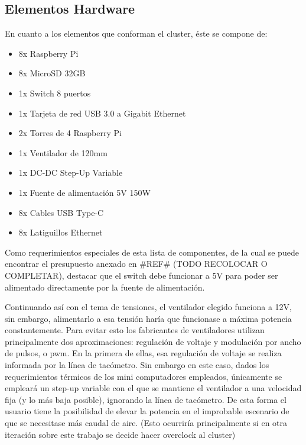 \subsection{Elementos Hardware}
En cuanto a los elementos que conforman el cluster, éste se compone de:
\begin{itemize}
    \item 8x Raspberry Pi
    \item 8x MicroSD 32GB
    \item 1x Switch 8 puertos
    \item 1x Tarjeta de red USB 3.0 a Gigabit Ethernet 
    \item 2x Torres de 4 Raspberry Pi
    \item 1x Ventilador de 120mm
    \item 1x DC-DC Step-Up Variable 
    \item 1x Fuente de alimentación 5V 150W
    \item 8x Cables USB Type-C
    \item 8x Latiguillos Ethernet
\end{itemize}

Como requerimientos especiales de esta lista de componentes, de la cual se puede encontrar el presupuesto anexado en \#REF\# (TODO RECOLOCAR O COMPLETAR), destacar que el switch debe funcionar a 5V para poder ser alimentado directamente por la fuente de alimentación.

Continuando así con el tema de tensiones, el ventilador elegido funciona a 12V, sin embargo, alimentarlo a esa tensión haría que funcionase a máxima potencia constantemente. Para evitar esto los fabricantes de ventiladores utilizan principalmente dos aproximaciones: regulación de voltaje y modulación por ancho de pulsos, o \acrshort{pwm}. En la primera de ellas, esa regulación de voltaje se realiza informada por la línea de tacómetro. Sin embargo en este caso,  dados los requerimientos térmicos de los mini computadores empleados, únicamente se empleará un step-up variable con el que se mantiene el ventilador a una velocidad fija (y lo más baja posible), ignorando la línea de tacómetro. De esta forma el usuario tiene la posibilidad de elevar la potencia en el improbable escenario de que se necesitase más caudal de aire. (Esto ocurriría principalmente si en otra iteración sobre este trabajo se decide hacer overclock al cluster)


